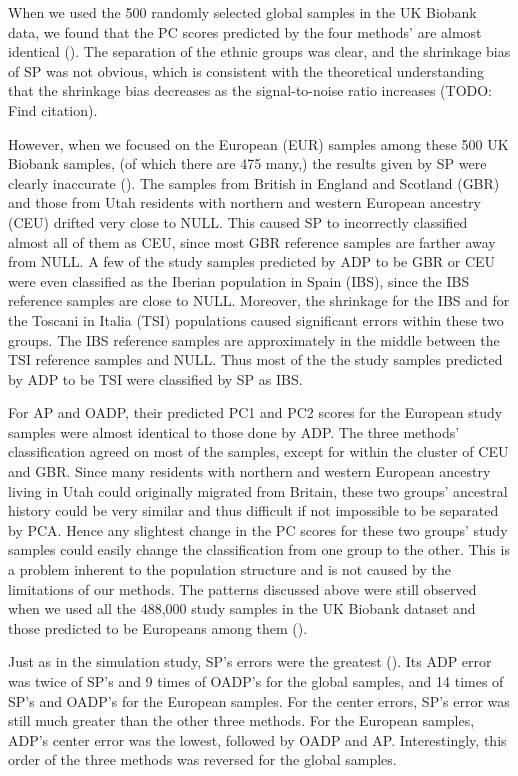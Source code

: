 \documentclass{article}
\newcommand{\todo}[1]{{\color{red} (TODO: #1)}}
\begin{document}
When we used the 500 randomly selected global samples
in the UK Biobank data,
we found that the PC scores predicted by the four methods' are almost identical ().
The separation of the ethnic groups was clear,
and the shrinkage bias of SP was not obvious,
which is consistent with the theoretical understanding
that the shrinkage bias decreases
as the signal-to-noise ratio increases \todo{Find citation}.

However, when we focused on the European (EUR) samples
among these 500 UK Biobank samples,
(of which there are 475 many,)
the results given by SP were clearly inaccurate ().
The samples from British in England and Scotland (GBR)
and those from Utah residents with northern and western European ancestry	(CEU)
drifted very close to NULL.
This caused SP to incorrectly classified almost all of them as CEU,
since most GBR reference samples are farther away from NULL.
A few of the study samples predicted by ADP to be GBR or CEU
were even classified as the Iberian population in Spain (IBS),
since the IBS reference samples are close to NULL.
Moreover, the shrinkage for the IBS
and for the Toscani in Italia (TSI) populations
caused significant errors within these two groups.
The IBS reference samples
are approximately in the middle
between the TSI reference samples and NULL.
Thus most of the the study samples predicted by ADP to be TSI
were classified by SP as IBS.

For AP and OADP, their predicted PC1 and PC2 scores
for the European study samples
were almost identical
to those done by ADP.
The three methods' classification
agreed on most of the samples,
except for within the cluster of CEU and GBR.
Since many residents with northern and western European ancestry living in Utah
could originally migrated from Britain,
these two groups' ancestral history could be very similar
and thus difficult if not impossible to be separated by PCA.
Hence any slightest change
in the PC scores for these two groups' study samples
could easily change the classification from one group to the other.
This is a problem inherent to the population structure
and is not caused by the limitations of our methods.
The patterns discussed above
were still observed
when we used all the 488,000 study samples in the UK Biobank dataset
and those predicted to be Europeans among them ().


Just as in the simulation study,
SP's errors were the greatest ().
Its ADP error
was twice of SP's and 9 times of OADP's for the global samples,
and 14 times of SP's and OADP's for the European samples.
For the center errors,
SP's error was still much greater than the other three methods.
For the European samples,
ADP's center error was the lowest,
followed by OADP and AP.
Interestingly, this order of the three methods
was reversed for the global samples.
\end{document}
